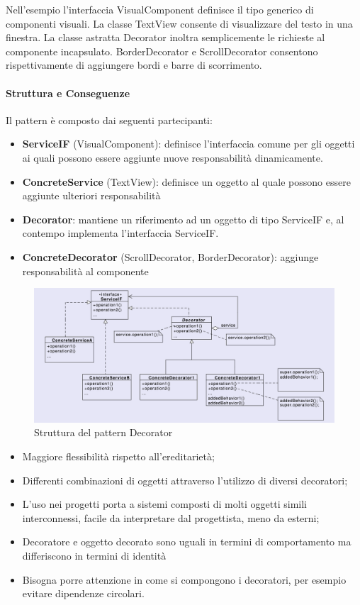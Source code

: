 Nell'esempio l'interfaccia VisualComponent definisce il tipo generico di componenti visuali. La classe TextView consente di visualizzare del testo in una finestra. La classe astratta Decorator inoltra semplicemente le richieste al componente incapsulato. BorderDecorator e ScrollDecorator consentono rispettivamente di aggiungere bordi e barre di scorrimento.

\paragraph{Struttura e Conseguenze} Il pattern è composto dai seguenti partecipanti:
\begin{itemize}
    \item \textbf{ServiceIF} (VisualComponent): definisce l'interfaccia comune per gli oggetti ai quali possono essere aggiunte nuove responsabilità dinamicamente.
    \item \textbf{ConcreteService} (TextView): definisce un oggetto al quale possono essere aggiunte ulteriori responsabilità
    \item \textbf{Decorator}: mantiene un riferimento ad un oggetto di tipo ServiceIF e, al contempo implementa l'interfaccia ServiceIF.
    \item \textbf{ConcreteDecorator} (ScrollDecorator, BorderDecorator): aggiunge responsabilità al componente
\end{itemize}


\begin{figure}[H]
    \centering
    \includegraphics[width=1\linewidth]{assets/pattern/decorator/decorator-struttura.png}
    \caption{Struttura del pattern Decorator}
\end{figure}

\begin{itemize}
    \item Maggiore flessibilità rispetto all'ereditarietà;
    \item Differenti combinazioni di oggetti attraverso l'utilizzo di diversi decoratori;
    \item L'uso nei progetti porta a sistemi composti di molti oggetti simili interconnessi, facile da interpretare dal progettista, meno da esterni;
    \item Decoratore e oggetto decorato sono uguali in termini di comportamento ma differiscono in termini di identità
    \item Bisogna porre attenzione in come si compongono i decoratori, per esempio evitare dipendenze circolari.
\end{itemize}

